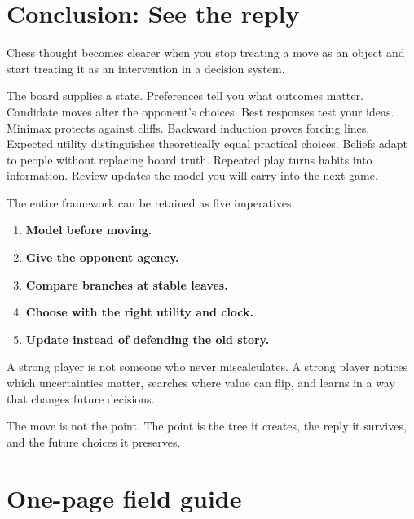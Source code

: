 \chapter*{Conclusion: See the reply}

Chess thought becomes clearer when you stop treating a move as an object and start treating it as an intervention in a decision system.

The board supplies a state. Preferences tell you what outcomes matter. Candidate moves alter the opponent's choices. Best responses test your ideas. Minimax protects against cliffs. Backward induction proves forcing lines. Expected utility distinguishes theoretically equal practical choices. Beliefs adapt to people without replacing board truth. Repeated play turns habits into information. Review updates the model you will carry into the next game.

The entire framework can be retained as five imperatives:

\begin{enumerate}[label=\textbf{\arabic*.},leftmargin=2em]
\item \textbf{Model before moving.}
\item \textbf{Give the opponent agency.}
\item \textbf{Compare branches at stable leaves.}
\item \textbf{Choose with the right utility and clock.}
\item \textbf{Update instead of defending the old story.}
\end{enumerate}

A strong player is not someone who never miscalculates. A strong player notices which uncertainties matter, searches where value can flip, and learns in a way that changes future decisions.

\begin{memorybox}[title={The final memory hook}]
The move is not the point. The point is the tree it creates, the reply it survives, and the future choices it preserves.
\end{memorybox}

\chapter*{One-page field guide}

